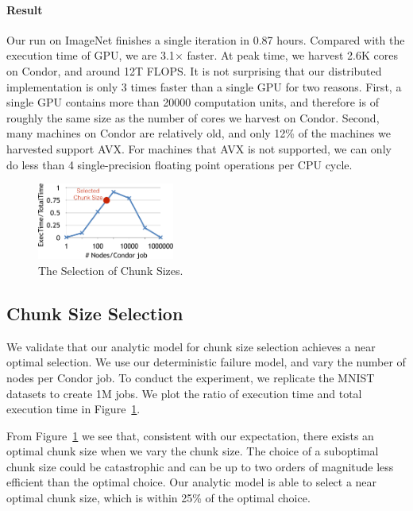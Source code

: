 \documentclass[11pt]{article}
\begin{document}
\paragraph*{Result} Our run on ImageNet finishes a single
iteration in 0.87 hours. Compared with the execution time of
GPU, we are 3.1$\times$ faster. At peak time, we harvest
2.6K cores on Condor, and around 12T FLOPS. It is not surprising
that our distributed implementation is only 3 times faster
than a single GPU for two reasons. First, a single GPU contains
more than 20000 computation units, and therefore is of roughly
the same size as the number of cores we harvest on Condor.
Second, many machines on Condor are relatively old, and only 12\%
of the machines we harvested support AVX. For machines that
AVX is not supported, we can only do less than 4 single-precision
floating point operations per CPU cycle.


\begin{figure}[t]
\centering
\includegraphics[width=0.4\textwidth]{figures/chunk-crop}
\caption{The Selection of Chunk Sizes.}
\label{fig:chunksize}
\end{figure}


\subsection{Chunk Size Selection}

We validate that our analytic model for chunk size selection
achieves a near optimal selection. We use our deterministic
failure model, and vary the number of nodes per Condor job.
To conduct the experiment, we replicate the MNIST datasets
to create 1M jobs. We plot the ratio of execution
time and total execution time in Figure~\ref{fig:chunksize}.

From Figure~\ref{fig:chunksize} we see that, consistent
with our expectation, there exists an optimal chunk size
when we vary the chunk size. The choice of a suboptimal
chunk size could be catastrophic and can be up to
two orders of magnitude less efficient than the optimal choice.
Our analytic model is able to select a near optimal
chunk size, which is within 25\% of the optimal choice.
\end{document}
